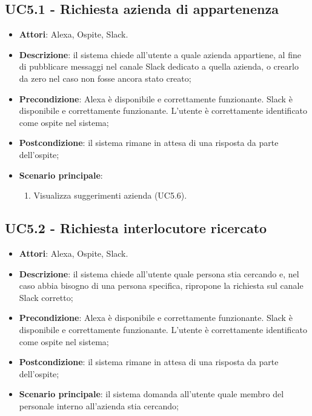 \documentclass[../AnalisiDeiRequisiti_v4.0.0.tex]{subfiles}
\begin{document}
\subsection{UC5.1 - Richiesta azienda di appartenenza} 
\label{sssec:UC5.1} 
\begin{itemize} 
\item \textbf{Attori}: Alexa, Ospite, Slack.
\item \textbf{Descrizione}: il sistema chiede all'utente a quale azienda appartiene, al fine di pubblicare messaggi nel canale Slack dedicato a quella azienda, o crearlo da zero nel caso non fosse ancora stato creato;
\item \textbf{Precondizione}: Alexa è disponibile e correttamente funzionante. Slack è disponibile e correttamente funzionante. L'utente è correttamente identificato come ospite nel sistema;
\item \textbf{Postcondizione}: il sistema rimane in attesa di una risposta da parte dell'ospite;
\item \textbf{Scenario principale}: \begin{enumerate}\item Visualizza suggerimenti azienda (UC5.6). 
 \end{enumerate}
\end{itemize} 
\subsection{UC5.2 - Richiesta interlocutore ricercato} 
\label{sssec:UC5.2} 
\begin{itemize} 
\item \textbf{Attori}: Alexa, Ospite, Slack.
\item \textbf{Descrizione}: il sistema chiede all'utente quale persona stia cercando e, nel caso abbia bisogno di una persona specifica, ripropone la richiesta sul canale Slack corretto;
\item \textbf{Precondizione}: Alexa è disponibile e correttamente funzionante. Slack è disponibile e correttamente funzionante. L'utente è correttamente identificato come ospite nel sistema;
\item \textbf{Postcondizione}: il sistema rimane in attesa di una risposta da parte dell'ospite;
\item \textbf{Scenario principale}: il sistema domanda all'utente quale membro del personale interno all'azienda stia cercando;
\end{itemize} 
\end{document}
